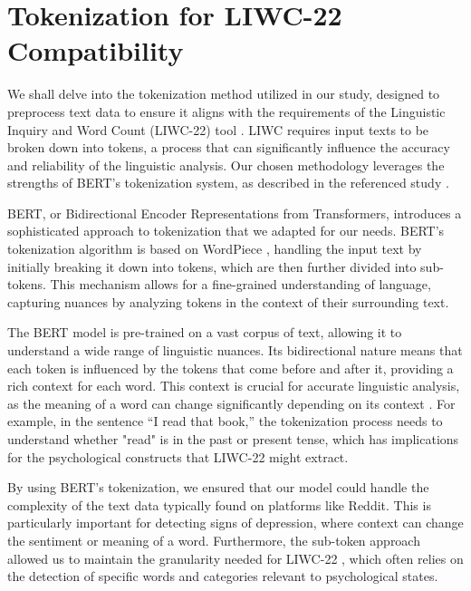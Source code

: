 \section{Tokenization for LIWC-22 Compatibility}

\quad We shall delve into the tokenization method utilized in our study, designed to preprocess text data to ensure it aligns with the requirements of the Linguistic Inquiry and Word Count (LIWC-22) tool \cite{boyd2022development}. LIWC requires input texts to be broken down into tokens, a process that can significantly influence the accuracy and reliability of the linguistic analysis. Our chosen methodology leverages the strengths of BERT's tokenization system, as described in the referenced study \cite{bertTokenizerEnglish}.

BERT, or Bidirectional Encoder Representations from Transformers, introduces a sophisticated approach to tokenization that we adapted for our needs. BERT’s tokenization algorithm is based on WordPiece \cite{wu2016google}, handling the input text by initially breaking it down into tokens, which are then further divided into sub-tokens. This mechanism allows for a fine-grained understanding of language, capturing nuances by analyzing tokens in the context of their surrounding text.

The BERT model is pre-trained on a vast corpus of text, allowing it to understand a wide range of linguistic nuances. Its bidirectional nature means that each token is influenced by the tokens that come before and after it, providing a rich context for each word. This context is crucial for accurate linguistic analysis, as the meaning of a word can change significantly depending on its context \cite{bertTokenizerEnglish}. For example, in the sentence “I read that book,” the tokenization process needs to understand whether "read" is in the past or present tense, which has implications for the psychological constructs that LIWC-22 might extract.

By using BERT's tokenization, we ensured that our model could handle the complexity of the text data typically found on platforms like Reddit. This is particularly important for detecting signs of depression, where context can change the sentiment or meaning of a word. Furthermore, the sub-token approach allowed us to maintain the granularity needed for LIWC-22 \cite{boyd2022development}, which often relies on the detection of specific words and categories relevant to psychological states.









